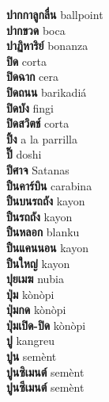 \textbf{ ปากกาลูกลื่น  } ballpoint \\
\textbf{ ปากขวด  } boca \\
\textbf{ ปาฏิหาริย์  } bonanza \\
\textbf{ ปิด  } corta \\
\textbf{ ปิดฉาก  } cera \\
\textbf{ ปิดถนน  } barikadiá \\
\textbf{ ปิดบัง  } fingi \\
\textbf{ ปิดสวิตช์  } corta \\
\textbf{ ปิ้ง  } a la parrilla \\
\textbf{ ปิ๊  } doshi \\
\textbf{ ปีศาจ  } Satanas \\
\textbf{ ปืนคาร์บิน  } carabina \\
\textbf{ ปืนบนรถถัง  } kayon \\
\textbf{ ปืนรถถัง  } kayon \\
\textbf{ ปืนหลอก  } blanku \\
\textbf{ ปืนแคนนอน  } kayon \\
\textbf{ ปืนใหญ่  } kayon \\
\textbf{ ปุยเมฆ  } nubia \\
\textbf{ ปุ่ม  } kònòpi \\
\textbf{ ปุ่มกด  } kònòpi \\
\textbf{ ปุ่มเปิด-ปิด  } kònòpi \\
\textbf{ ปู  } kangreu \\
\textbf{ ปูน  } semènt \\
\textbf{ ปูนซิเมนต์  } semènt \\
\textbf{ ปูนซีเมนต์  } semènt \\
